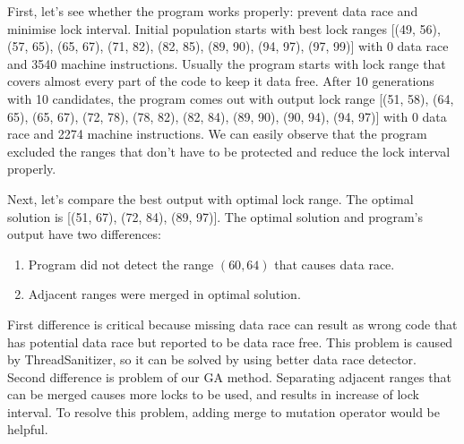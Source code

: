First, let's see whether the program works properly: prevent data race and minimise lock interval. Initial population starts with best lock ranges [(49, 56), (57, 65), (65, 67), (71, 82), (82, 85), (89, 90), (94, 97), (97, 99)] with 0 data race and 3540 machine instructions. Usually the program starts with lock range that covers almost every part of the code to keep it data free. After 10 generations with 10 candidates, the program comes out with output lock range [(51, 58), (64, 65), (65, 67), (72, 78), (78, 82), (82, 84), (89, 90), (90, 94), (94, 97)] with 0 data race and 2274 machine instructions. We can easily observe that the program excluded the ranges that don't have to be protected and reduce the lock interval properly. 

Next, let's compare the best output with optimal lock range. The optimal solution is [(51, 67), (72, 84), (89, 97)]. The optimal solution and program's output have two differences:

\begin{enumerate}
    \item Program did not detect the range $(60, 64)$ that causes data race.
    \item Adjacent ranges were merged in optimal solution.
\end{enumerate}

First difference is critical because missing data race can result as wrong code that has potential data race but reported to be data race free. This problem is caused by ThreadSanitizer, so it can be solved by using better data race detector. Second difference is problem of our GA method. Separating adjacent ranges that can be merged causes more locks to be used, and results in increase of lock interval. To resolve this problem, adding merge to mutation operator would be helpful.
